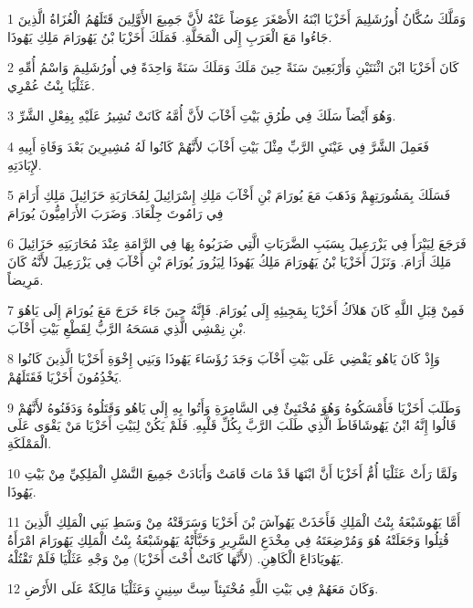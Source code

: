 \par 1 وَمَلَّكَ سُكَّانُ أُورُشَلِيمَ أَخَزْيَا ابْنَهُ الأَصْغَرَ عِوَضاً عَنْهُ لأَنَّ جَمِيعَ الأَوَّلِينَ قَتَلَهُمُ الْغُزَاةُ الَّذِينَ جَاءُوا مَعَ الْعَرَبِ إِلَى الْمَحَلَّةِ. فَمَلَكَ أَخَزْيَا بْنُ يَهُورَامَ مَلِكِ يَهُوذَا.
\par 2 كَانَ أَخَزْيَا ابْنَ اثْنَتَيْنِ وَأَرْبَعِينَ سَنَةً حِينَ مَلَكَ وَمَلَكَ سَنَةً وَاحِدَةً فِي أُورُشَلِيمَ وَاسْمُ أُمِّهِ عَثَلْيَا بِنْتُ عُمْرِي.
\par 3 وَهُوَ أَيْضاً سَلَكَ فِي طُرُقِ بَيْتِ أَخْآبَ لأَنَّ أُمَّهُ كَانَتْ تُشِيرُ عَلَيْهِ بِفِعْلِ الشَّرِّ.
\par 4 فَعَمِلَ الشَّرَّ فِي عَيْنَيِ الرَّبِّ مِثْلَ بَيْتِ أَخْآبَ لأَنَّهُمْ كَانُوا لَهُ مُشِيرِينَ بَعْدَ وَفَاةِ أَبِيهِ لإِبَادَتِهِ.
\par 5 فَسَلَكَ بِمَشُورَتِهِمْ وَذَهَبَ مَعَ يُورَامَ بْنِ أَخْآبَ مَلِكِ إِسْرَائِيلَ لِمُحَارَبَةِ حَزَائِيلَ مَلِكِ أَرَامَ فِي رَامُوتَ جِلْعَادَ. وَضَرَبَ الأَرَامِيُّونَ يُورَامَ
\par 6 فَرَجَعَ لِيَبْرَأَ فِي يَزْرَعِيلَ بِسَبَبِ الضَّرَبَاتِ الَّتِي ضَرَبُوهُ بِهَا فِي الرَّامَةِ عِنْدَ مُحَارَبَتِهِ حَزَائِيلَ مَلِكَ أَرَامَ. وَنَزَلَ أَخَزْيَا بْنُ يَهُورَامَ مَلِكُ يَهُوذَا لِيَزُورَ يُورَامَ بْنِ أَخْآبَ فِي يَزْرَعِيلَ لأَنَّهُ كَانَ مَرِيضاً.
\par 7 فَمِنْ قِبَلِ اللَّهِ كَانَ هَلاَكُ أَخَزْيَا بِمَجِيئِهِ إِلَى يُورَامَ. فَإِنَّهُ حِينَ جَاءَ خَرَجَ مَعَ يُورَامَ إِلَى يَاهُوَ بْنِ نِمْشِي الَّذِي مَسَحَهُ الرَّبُّ لِقَطْعِ بَيْتِ أَخْآبَ.
\par 8 وَإِذْ كَانَ يَاهُو يَقْضِي عَلَى بَيْتِ أَخْآبَ وَجَدَ رُؤَسَاءَ يَهُوذَا وَبَنِي إِخْوَةِ أَخَزْيَا الَّذِينَ كَانُوا يَخْدُِمُونَ أَخَزْيَا فَقَتَلَهُمْ.
\par 9 وَطَلَبَ أَخَزْيَا فَأَمْسَكُوهُ وَهُوَ مُخْتَبِئٌ فِي السَّامِرَةِ وَأَتُوا بِهِ إِلَى يَاهُو وَقَتَلُوهُ وَدَفَنُوهُ لأَنَّهُمْ قَالُوا إِنَّهُ ابْنُ يَهُوشَافَاطَ الَّذِي طَلَبَ الرَّبَّ بِكُلِّ قَلْبِهِ. فَلَمْ يَكُنْ لِبَيْتِ أَخَزْيَا مَنْ يَقْوَى عَلَى الْمَمْلَكَةِ.
\par 10 وَلَمَّا رَأَتْ عَثَلْيَا أُمُّ أَخَزْيَا أَنَّ ابْنَهَا قَدْ مَاتَ قَامَتْ وَأَبَادَتْ جَمِيعَ النَّسْلِ الْمَلِكِيِّ مِنْ بَيْتِ يَهُوذَا.
\par 11 أَمَّا يَهُوشَبْعَةُ بِنْتُ الْمَلِكِ فَأَخَذَتْ يَهُوآشَ بْنَ أَخَزْيَا وَسَرَقَتْهُ مِنْ وَسَطِ بَنِي الْمَلِكِ الَّذِينَ قُتِلُوا وَجَعَلَتْهُ هُوَ وَمُرْضِعَتَهُ فِي مِخْدَعِ السَّرِيرِ وَخَبَّأَتْهُ يَهُوشَبْعَةُ بِنْتُ الْمَلِكِ يَهُورَامَ امْرَأَةُ يَهُويَادَاعَ الْكَاهِنِ. (لأَنَّهَا كَانَتْ أُخْتَ أَخَزْيَا) مِنْ وَجْهِ عَثَلْيَا فَلَمْ تَقْتُلْهُ.
\par 12 وَكَانَ مَعَهُمْ فِي بَيْتِ اللَّهِ مُخْتَبِئاً سِتَّ سِنِينٍ وَعَثَلْيَا مَالِكَةٌ عَلَى الأَرْضِ.

